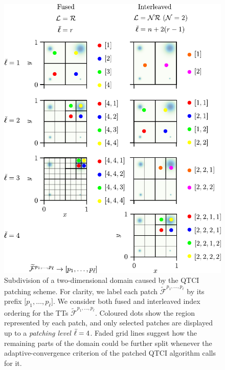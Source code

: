 \begin{figure}[ht!]
	\includegraphics{figures/PatchDivision.pdf}
	\caption{Subdivision of a two-dimensional domain caused by the QTCI patching scheme. For clarity, we label each patch $\widetilde{\mathcal F}^{p_1,\dots,p_{\bar\ell}}$ by its prefix $\bigl[p_1,\dots,p_{\bar\ell}\bigr]$. We consider both fused and interleaved index ordering for the TTs $\widetilde{\mathcal F}^{p_1,\dots,p_{\bar\ell}}$. Coloured dots show the region represented by each patch, and only selected patches are displayed up to a \textit{patching level} ${\bar \ell}=4$. Faded grid lines suggest how the remaining parts of the domain could be further split whenever the adaptive-convergence criterion of the patched QTCI algorithm calls for it.}
	\label{fig:patchSubdivision}
\end{figure}

